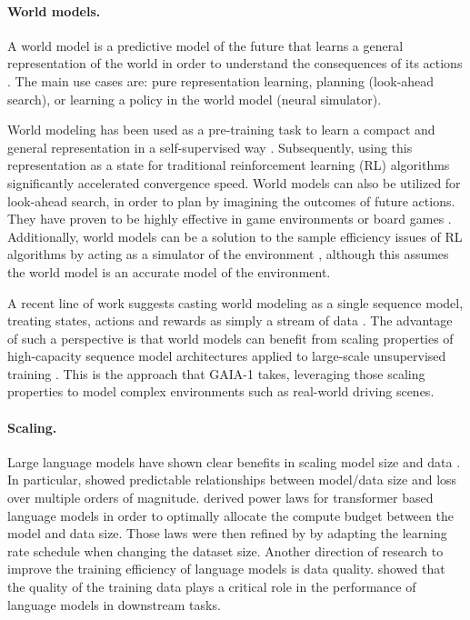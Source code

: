 \paragraph{World models.} 
A world model is a predictive model of the future that learns a general representation of the world in order to understand the consequences of its actions \citep{ha18,lecun22}. The main use cases are: pure representation learning, planning (look-ahead search), or learning a policy in the world model (neural simulator). 

World modeling has been used as a pre-training task to learn a compact and general representation in a self-supervised way \citep{Schwarzer2020DataEfficientRL,wu2023masked}. Subsequently, using this representation as a state for traditional reinforcement learning (RL) algorithms significantly accelerated convergence speed. World models can also be utilized for look-ahead search, in order to plan by imagining the outcomes of future actions. They have proven to be highly effective in game environments or board games \citep{schrittwieser2020mastering,ye2021mastering}. Additionally, world models can be a solution to the sample efficiency issues of RL algorithms by acting as a simulator of the environment \citep{ha18,kaizer19,hafner2021dreamerv2,kim2021drivegan,hafner2023mastering,wu2023daydreamer,wang2023drive}, although this assumes the world model is an accurate model of the environment. 

A recent line of work suggests casting world modeling as a single sequence model, treating states, actions and rewards as simply a stream of data \citep{janner2021sequence,chen2021decisiontransformer,reed22gato,liu2022masked,micheli2023transformers,commavq2023}. The advantage of such a perspective is that world models can benefit from scaling properties of high-capacity sequence model architectures applied to large-scale unsupervised training \citep{brown20}. This is the approach that GAIA-1 takes, leveraging those scaling properties to model  complex environments such as real-world driving scenes.



\paragraph{Scaling.} 
Large language models have shown clear benefits in scaling model size and data \citep{devlin-bert19,2020t5,brown20,megatron22,Chowdhery2022PaLMSL,llama23,openai2023gpt4}. In particular, \citep{kaplan20} showed predictable relationships between model/data size and loss over multiple orders of magnitude. 
\citep{kaplan20} derived power laws for transformer based language models in order to optimally allocate the compute budget between the model and data size. Those laws were then refined by \citep{hoffmann22} by adapting the learning rate schedule when changing the dataset size. Another direction of research to improve the training efficiency of language models is data quality. \citep{du22} showed that the quality of the training data plays a critical role in the performance of language models in downstream tasks. 

